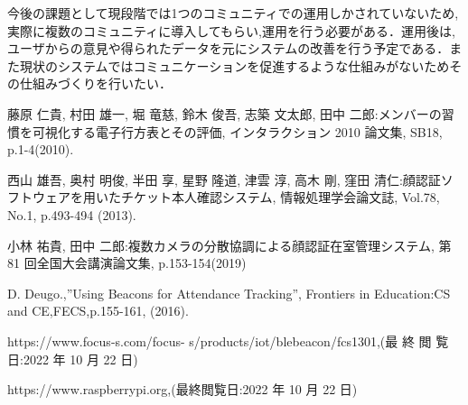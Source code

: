 \documentclass[a4j,8pt,twocolumn]{extarticle}
\begin{document}
今後の課題として現段階では1つのコミュニティでの運用しかされていないため,実際に複数のコミュニティに導入してもらい,運用を行う必要がある．運用後は,ユーザからの意見や得られたデータを元にシステムの改善を行う予定である．また現状のシステムではコミュニケーションを促進するような仕組みがないためその仕組みづくりを行いたい．















\begin{thebibliography}{9}

藤原 仁貴, 村田 雄一, 堀 竜慈, 鈴木 俊吾, 志築 文太郎, 田中 二郎:メンバーの習慣を可視化する電子行方表とその評価, インタラクション 2010 論文集, SB18, p.1-4(2010).

西山 雄吾, 奥村 明俊, 半田 享, 星野 隆道, 津雲 淳, 高木 剛, 窪田 清仁:顔認証ソフトウェアを用いたチケット本人確認システム, 情報処理学会論文誌, Vol.78, No.1, p.493-494 (2013).

小林 祐貴, 田中 二郎:複数カメラの分散協調による顔認証在室管理システム, 第 81 回全国大会講演論文集, p.153-154(2019)

D. Deugo.,”Using Beacons for Attendance Tracking”, Frontiers in Education:CS and CE,FECS,p.155-161, (2016).

https://www.focus-s.com/focus- s/products/iot/blebeacon/fcs1301,(最 終 閲 覧 日:2022 年 10 月 22 日)

https://www.raspberrypi.org,(最終閲覧日:2022 年 10 月 22 日)






\end{thebibliography}




\end{document}
